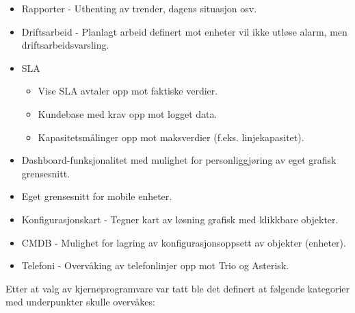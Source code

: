 \begin{itemize}
	\item Rapporter - Uthenting av trender, dagens situasjon osv.
	\item Driftsarbeid - Planlagt arbeid definert mot enheter vil ikke utløse alarm, men driftsarbeidsvarsling.
	\item SLA
	\begin{itemize}
		\item Vise SLA avtaler opp mot faktiske verdier.
		\item Kundebase med krav opp mot logget data.
		\item Kapasitetsmålinger opp mot maksverdier (f.eks. linjekapasitet).
	\end{itemize}
	\item Dashboard-funksjonalitet med mulighet for personliggjøring av eget grafisk grensesnitt.
	\item Eget grensesnitt for mobile enheter.
	\item Konfigurasjonskart - Tegner kart av løsning grafisk med klikkbare objekter.
	\item CMDB - Mulighet for lagring av konfigurasjonsoppsett av objekter (enheter).
	\item Telefoni - Overvåking av telefonlinjer opp mot Trio og Asterisk.
\end{itemize}

Etter at valg av kjerneprogramvare var tatt ble det definert at følgende kategorier med underpunkter skulle overvåkes:

